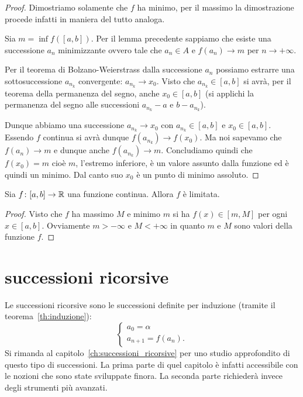%
\begin{proof}
\mymark{***}
Dimostriamo solamente che $f$ ha minimo, per il massimo la dimostrazione procede
infatti in maniera del tutto analoga.

Sia $m= \inf f([a,b])$.
Per il lemma precedente sappiamo che esiste una successione $a_n$ minimizzante ovvero tale che
$a_n \in A$ e $f(a_n)\to m$ per $n\to +\infty$.

Per il teorema di Bolzano-Weierstrass dalla successione $a_n$ possiamo estrarre una sottosuccessione $a_{n_k}$ convergente: $a_{n_k} \to x_0$.
Visto che $a_{n_k} \in [a,b]$ si avrà, per il teorema della permanenza del segno, anche $x_0 \in [a,b]$ (si applichi la permanenza del segno alle successioni $a_{n_k}-a$ e $b-a_{n_k}$).

Dunque abbiamo una successione $a_{n_k}\to x_0$ con $a_{n_k}\in [a,b]$ e
$x_0 \in [a,b]$. Essendo $f$ continua si avrà dunque $f(a_{n_k}) \to f(x_0)$.
Ma noi sapevamo che $f(a_n)\to m$ e dunque anche $f(a_{n_k}) \to m$.
Concludiamo quindi che $f(x_0) = m$ cioè $m$, l'estremo inferiore,
è un valore assunto dalla funzione ed è quindi un minimo.
Dal canto suo $x_0$ è un punto di minimo assoluto.
\end{proof}

\begin{corollary}
Sia $f\colon [a,b]\to \mathbb R$ una funzione continua. Allora $f$ è limitata.
\end{corollary}
\begin{proof}
Visto che $f$ ha massimo $M$ e minimo $m$ si ha $f(x)\in [m,M]$ per ogni $x\in[a,b]$.
Ovviamente $m>-\infty$ e $M<+\infty$ in quanto $m$ e $M$ sono valori della funzione $f$.
\end{proof}


\section{successioni ricorsive}

Le successioni ricorsive sono le successioni
definite per induzione (tramite il teorema~\ref{th:induzione}):
\[
 \begin{cases}
   a_0 = \alpha \\
   a_{n+1} = f(a_n).
 \end{cases}
\]
Si rimanda al capitolo~\ref{ch:successioni_ricorsive}
per uno studio approfondito di questo tipo di successioni.
La prima parte di quel capitolo è infatti accessibile con le nozioni
che sono state sviluppate finora.
La seconda parte richiederà invece degli strumenti più avanzati.
